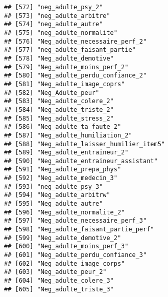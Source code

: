 \documentclass[
]{article}
\begin{document}
\begin{verbatim}
## [572] "neg_adulte_psy_2"                                                  
## [573] "neg_adulte_arbitre"                                                
## [574] "neg_adulte_autre"                                                  
## [575] "neg_adulte_normalite"                                              
## [576] "Neg_adulte_necessaire_perf_2"                                      
## [577] "neg_adulte_faisant_partie"                                         
## [578] "Neg_adulte_demotive"                                               
## [579] "Neg_adulte_moins_perf_2"                                           
## [580] "Neg_adulte_perdu_confiance_2"                                      
## [581] "Neg_adulte_image_coprs"                                            
## [582] "Neg_Adulte_peur"                                                   
## [583] "Neg_adulte_colere_2"                                               
## [584] "Neg_adulte_triste_2"                                               
## [585] "Neg_adulte_stress_2"                                               
## [586] "Neg_adulte_ta_faute_2"                                             
## [587] "Neg_adulte_humiliation_2"                                          
## [588] "Neg_adulte_laisser_humilier_item5"                                 
## [589] "Neg_adulte_entraineur_2"                                           
## [590] "Neg_adulte_entraineur_assistant"                                   
## [591] "Neg_adulte_prepa_phys"                                             
## [592] "Neg_adulte_medecin_3"                                              
## [593] "neg_adulte_psy_3"                                                  
## [594] "Neg_adulte_arbitrw"                                                
## [595] "Neg_adulte_autre"                                                  
## [596] "Neg_adulte_normalite_2"                                            
## [597] "Neg_adulte_necessaire_perf_3"                                      
## [598] "Neg_adulte_faisant_partie_perf"                                    
## [599] "Neg_adulte_demotive_2"                                             
## [600] "Neg_adulte_moins_perf_3"                                           
## [601] "Neg_adulte_perdu_confiance_3"                                      
## [602] "Neg_adulte_image_corps"                                            
## [603] "Neg_adulte_peur_2"                                                 
## [604] "Neg_adulte_colere_3"                                               
## [605] "Neg_adulte_triste_3"                                               

\end{verbatim}
\end{document}

